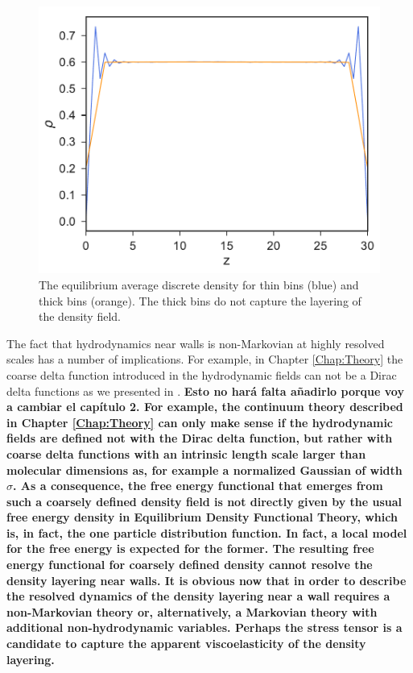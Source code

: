 \documentclass[b5paper,openright,11pt]{book}
\newcommand{\Note}[1]{{\bf \color{red}#1}}    %
\begin{document}
\begin{figure}[h!]
  \centering
\includegraphics[scale=0.41]{DensityProfile-WALLS}
\caption[Fluid density profile for 66 and 17 nodes.]{The equilibrium average discrete density for thin bins (blue) and thick bins (orange). The thick bins do not capture the layering of the density field.}
\label{fig:DensityProfile-WALLS}
\end{figure}

The  fact that  hydrodynamics near  walls is  non-Markovian at  highly
resolved  scales  has a  number  of  implications. For example, in Chapter \ref{Chap:Theory} the coarse delta function introduced in the hydrodynamic fields can not be a Dirac delta functions as we presented in \cite{Camargo2018}. 
\Note{Esto no hará falta añadirlo porque voy a cambiar el capítulo 2. For  example,  the
continuum theory  described in Chapter \ref{Chap:Theory} can  only make
sense if the hydrodynamic fields are  defined not with the Dirac delta
function, but  rather with  coarse delta  functions with  an intrinsic
length  scale  larger than  molecular  dimensions  as, for  example  a
normalized Gaussian  of width  $\sigma$.  As  a consequence,  the free
energy functional  that emerges from  such a coarsely  defined density
field  is not  directly  given by  the usual  free  energy density  in
Equilibrium  Density Functional  Theory, which  is, in  fact, the  one
particle distribution function.  In fact,  a local model for the free energy 
is expected for  the former. The resulting free  energy functional for
coarsely  defined density  cannot  resolve the  density layering  near
walls.   It is  obvious now  that in  order to  describe the  resolved
dynamics of the density layering  near a wall requires a non-Markovian
theory  or,   alternatively,  a   Markovian  theory   with  additional
non-hydrodynamic variables.  Perhaps the  stress tensor is a candidate
to capture the apparent viscoelasticity of the density layering.}
\end{document}
